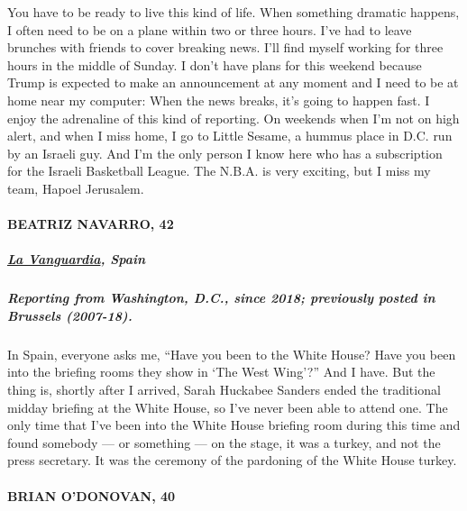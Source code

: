 You have to be ready to live this kind of life. When something dramatic
happens, I often need to be on a plane within two or three hours. I've
had to leave brunches with friends to cover breaking news. I'll find
myself working for three hours in the middle of Sunday. I don't have
plans for this weekend because Trump is expected to make an announcement
at any moment and I need to be at home near my computer: When the news
breaks, it's going to happen fast. I enjoy the adrenaline of this kind
of reporting. On weekends when I'm not on high alert, and when I miss
home, I go to Little Sesame, a hummus place in D.C. run by an Israeli
guy. And I'm the only person I know here who has a subscription for the
Israeli Basketball League. The N.B.A. is very exciting, but I miss my
team, Hapoel Jerusalem.

\hypertarget{beatriz-navarro-42}{%
\paragraph{BEATRIZ NAVARRO, 42}\label{beatriz-navarro-42}}

\hypertarget{la-vanguardia-spain}{%
\subparagraph{\texorpdfstring{\textbf{\href{https://www.lavanguardia.com/}{La
Vanguardia}, Spain}}{La Vanguardia, Spain}}\label{la-vanguardia-spain}}

\hypertarget{reporting-from-washington-dc-since-2018-previously-posted-in-brussels-2007-18}{%
\subparagraph{\texorpdfstring{\textbf{Reporting from Washington, D.C.,
since 2018; previously posted in Brussels
(2007-18).}}{Reporting from Washington, D.C., since 2018; previously posted in Brussels (2007-18).}}\label{reporting-from-washington-dc-since-2018-previously-posted-in-brussels-2007-18}}

In Spain, everyone asks me, ``Have you been to the White House? Have you
been into the briefing rooms they show in `The West Wing'?'' And I have.
But the thing is, shortly after I arrived, Sarah Huckabee Sanders ended
the traditional midday briefing at the White House, so I've never been
able to attend one. The only time that I've been into the White House
briefing room during this time and found somebody --- or something ---
on the stage, it was a turkey, and not the press secretary. It was the
ceremony of the pardoning of the White House turkey.

\hypertarget{brian-odonovan-40}{%
\paragraph{BRIAN O'DONOVAN, 40}\label{brian-odonovan-40}}

